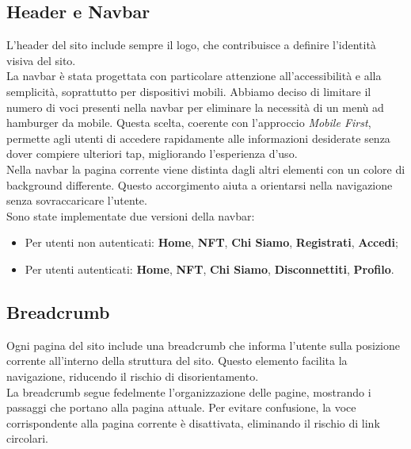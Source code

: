 \documentclass[10pt]{article}
\begin{document}
\subsection{Header e Navbar}
L'header del sito include sempre il logo, che contribuisce a definire l’identità visiva del sito.\\
La navbar è stata progettata con particolare attenzione all'accessibilità e alla semplicità, soprattutto per dispositivi mobili. Abbiamo deciso di limitare il numero di voci presenti nella navbar per eliminare la necessità di un menù ad hamburger da mobile. Questa scelta, coerente con l'approccio \textit{Mobile First}, permette agli utenti di accedere rapidamente alle informazioni desiderate senza dover compiere ulteriori tap, migliorando l’esperienza d’uso.\\
Nella navbar la pagina corrente viene distinta dagli altri elementi con un colore di background differente. Questo accorgimento aiuta a orientarsi nella navigazione senza sovraccaricare l'utente.\\

Sono state implementate due versioni della navbar:
\begin{itemize}
\item Per utenti non autenticati: \textbf{Home}, \textbf{NFT}, \textbf{Chi Siamo}, \textbf{Registrati}, \textbf{Accedi};
\item Per utenti autenticati: \textbf{Home}, \textbf{NFT}, \textbf{Chi Siamo}, \textbf{Disconnettiti}, \textbf{Profilo}.
\end{itemize}

\subsection{Breadcrumb}
Ogni pagina del sito include una breadcrumb che informa l'utente sulla posizione corrente all'interno della struttura del sito. Questo elemento facilita la navigazione, riducendo il rischio di disorientamento.\\
La breadcrumb segue fedelmente l’organizzazione delle pagine, mostrando i passaggi che portano alla pagina attuale. Per evitare confusione, la voce corrispondente alla pagina corrente è disattivata, eliminando il rischio di link circolari.
\end{document}
